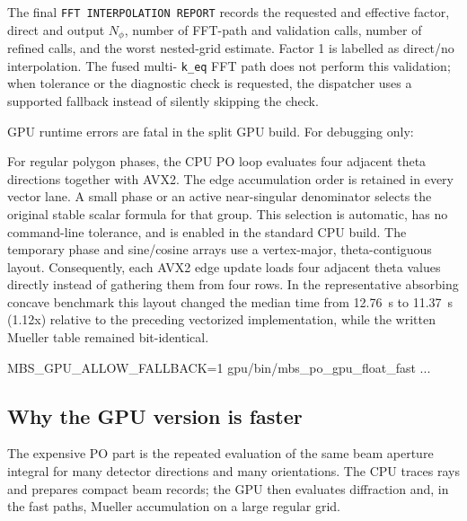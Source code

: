 \documentclass[
  10pt,
  a4paper,
]{article}
\newenvironment{Shaded}{}{}
\newcommand{\ExtensionTok}[1]{#1}
\newcommand{\NormalTok}[1]{#1}
\newcommand{\OperatorTok}[1]{\textcolor[rgb]{0.40,0.40,0.40}{#1}}
\newcommand{\VariableTok}[1]{\textcolor[rgb]{0.10,0.09,0.49}{#1}}
\begin{document}
The final \texttt{FFT INTERPOLATION REPORT} records the requested and effective
factor, direct and output $N_\phi$, number of FFT-path and validation calls,
number of refined calls, and the worst nested-grid estimate. Factor 1 is
labelled as direct/no interpolation. The fused multi-
\texttt{k\_eq} FFT path does not perform this validation; when tolerance or
the diagnostic check is requested, the dispatcher uses a supported fallback
instead of silently skipping the check.

GPU runtime errors are fatal in the split GPU build. For debugging only:

For regular polygon phases, the CPU PO loop evaluates four adjacent theta
directions together with AVX2. The edge accumulation order is retained in
every vector lane. A small phase or an active near-singular denominator
selects the original stable scalar formula for that group. This selection is
automatic, has no command-line tolerance, and is enabled in the standard CPU
build. The temporary phase and sine/cosine arrays use a vertex-major,
theta-contiguous layout. Consequently, each AVX2 edge update loads four
adjacent theta values directly instead of gathering them from four rows. In
the representative absorbing concave benchmark this layout changed the median
time from 12.76~s to 11.37~s (1.12x) relative to the preceding vectorized
implementation, while the written Mueller table remained bit-identical.

\begin{Shaded}
\begin{Highlighting}[]
\VariableTok{MBS\_GPU\_ALLOW\_FALLBACK}\OperatorTok{=}\NormalTok{1 }\ExtensionTok{gpu/bin/mbs\_po\_gpu\_float\_fast}\NormalTok{ ...}
\end{Highlighting}
\end{Shaded}

\subsection{Why the GPU version is
faster}\label{why-the-gpu-version-is-faster}

The expensive PO part is the repeated evaluation of the same beam
aperture integral for many detector directions and many orientations.
The CPU traces rays and prepares compact beam records; the GPU then
evaluates diffraction and, in the fast paths, Mueller accumulation on a
large regular grid.
\end{document}
